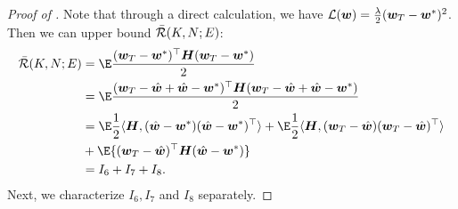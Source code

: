 \begin{proof}[Proof of ]

    
    Note that through a direct calculation, we have $\mathcal{L}({\bm{w}})=\frac{\lambda}{2}({\bm{w}}_T-{\bm{w}}^*)^2$. Then we can upper bound $\Bar{\mathcal{R}}(K,N;E)$:
    \begin{align*}
        \Bar{\cR}(K,N;E)&=\E\frac{(\vw_T-\vw^*)^{\top}\mH(\vw_T-\vw^*)}{2} \\
        &=\E\frac{(\vw_T-\hat{\vw}+\hat{\vw}-\vw^*)^{\top}\mH(\vw_T-\hat{\vw}+\hat{\vw}-\vw^*)}{2} \nonumber \\
        &= \E\frac{1}{2}\langle\mH,(\hat{\vw}-\vw^*)(\hat{\vw}-\vw^*)^{\top}\rangle+\E\frac{1}{2}\langle\mH,(\vw_T-\hat{\vw})(\vw_T-\hat{\vw})^{\top}\rangle  \\
        &+\E{(\vw_T-\hat{\vw})^{\top}\mH(\hat{\vw}-\vw^*)}  \\
        &=I_6+I_7+I_8.
    \end{align*}
    Next, we characterize $I_6, I_7$ and $I_8$ separately.
    

\end{proof}
